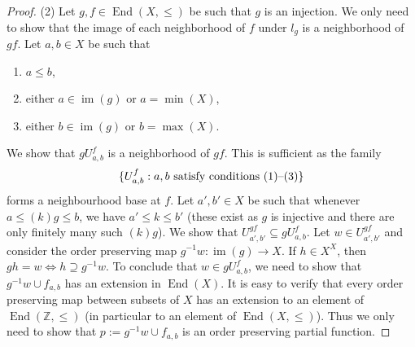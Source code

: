 \documentclass[10pt,a4paper]{amsart}
\newcommand{\Xendd}{\operatorname{End}(X, \leq)}
\newcommand{\Z}{\mathbb Z}
\newcommand{\im}{\operatorname{im}}
\begin{document}
\begin{proof}


(2) Let $g, f\in\Xendd$ be such that \(g\) is an injection. We only need to show that the image of each neighborhood of \(f\) under \(l_g\) is a neighborhood of \(gf\).
Let \(a,b\in X\) be such that 
\begin{enumerate}
    \item \(a\leq b\),
    \item either \(a\in \im(g)\) or \(a=\min(X)\),
    \item either \(b\in \im(g)\) or \(b=\max(X)\).
\end{enumerate}
We show that \(gU^f_{a,b}\) is a neighborhood of \(gf\). This is sufficient as the family \[\{U_{a,b}^f: a,b \hbox{ satisfy conditions } (1)\hbox{--}(3)\}\] forms a neighbourhood base at \(f\).
Let \(a',b'\in X\) be such that whenever \(a\leq (k)g \leq b\), we have \(a'\leq k \leq b'\) (these exist as \(g\) is injective and there are only finitely many such \((k)g\)).
We show that \(U^{gf}_{a',b'} \subseteq gU^f_{a,b}\).
Let \(w\in U^{gf}_{a',b'}\) and consider the order preserving map \(g^{-1}w:\im(g) \to X\).
If \(h\in X^X\), then \(gh=w \iff h\supseteq g^{-1}w\). 
To conclude that \(w\in gU^f_{a,b}\), we need to show that \(g^{-1}w\cup f_{a,b}\) has an extension in \(\operatorname{End}(X)\).
It is easy to verify that every order preserving map between subsets of \(X\) has an extension to an element of \(\operatorname{End}(\Z,\leq)\) (in particular to an element of \(\operatorname{End}(X,\leq)\)).
Thus we only need to show that \(p:=g^{-1}w\cup f_{a,b}\) is an order preserving partial function.


\end{proof}
\end{document}
